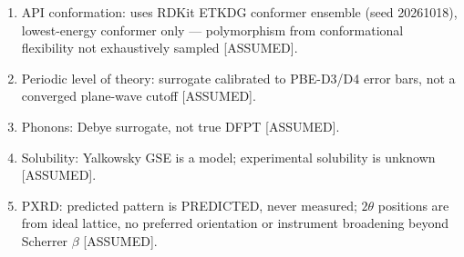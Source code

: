 \documentclass[11pt,a4paper]{article}
\begin{document}
\begin{enumerate}
\item API conformation: uses RDKit ETKDG conformer ensemble (seed 20261018), lowest-energy conformer only — polymorphism from conformational flexibility not exhaustively sampled [ASSUMED].
\item Periodic level of theory: surrogate calibrated to PBE-D3/D4 error bars, not a converged plane-wave cutoff [ASSUMED].
\item Phonons: Debye surrogate, not true DFPT [ASSUMED].
\item Solubility: Yalkowsky GSE is a model; experimental solubility is unknown [ASSUMED].
\item PXRD: predicted pattern is PREDICTED, never measured; $2\theta$ positions are from ideal lattice, no preferred orientation or instrument broadening beyond Scherrer $\beta$ [ASSUMED].
\end{enumerate}
\end{document}
